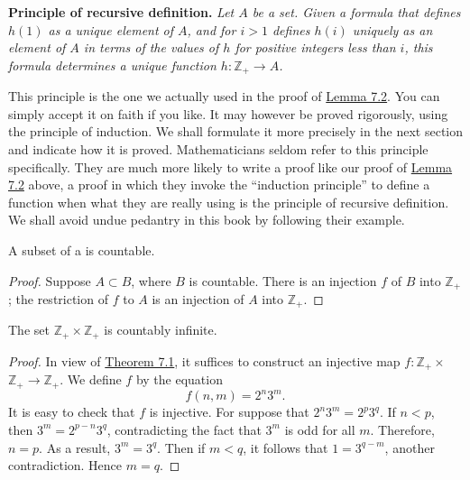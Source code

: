 \noindent\textbf{Principle of recursive definition.} \textsl{Let \(A\) be a set. Given a formula that defines \(h(1)\) as a unique element of \(A\), and for \(i > 1\) defines \(h(i)\) uniquely as an element of \(A\) in terms of the values of \(h\) for positive integers less than \(i\), this formula determines a unique function \(h : \mathbb{Z}_{+} \rightarrow A\).}

This principle is the one we actually used in the proof of \hyperref[lem:7.2]{Lemma 7.2}. You can simply accept it on faith if you like. It may however be proved rigorously, using the principle of induction. We shall formulate it more precisely in the next section and indicate how it is proved. Mathematicians seldom refer to this principle specifically. They are much more likely to write a proof like our proof of \hyperref[lem:7.2]{Lemma 7.2} above, a proof in which they invoke the ``induction principle'' to define a function when what they are really using is the principle of recursive definition. We shall avoid undue pedantry in this book by following their example.

\begin{corollary}
\label{cor:\thetheorem}
 A subset of a  is countable.
\end{corollary}

\begin{proof}
 Suppose \(A \subset B\), where \(B\) is countable. There is an injection \(f\) of \(B\) into \(\mathbb{Z}_{+}\) ; the restriction of \(f\) to \(A\) is an injection of \(A\) into \(\mathbb{Z}_{+}\).
\end{proof}

\begin{corollary}
\label{cor:\thetheorem}
 The set \(\mathbb{Z}_{+} \times {\mathbb{Z}}_{+}\) is countably infinite.
\end{corollary}

\begin{proof}
 In view of \hyperref[thm:7.1]{Theorem 7.1}, it suffices to construct an injective map \(f : \mathbb{Z}_{+} \times\) \(\mathbb{Z}_{+} \rightarrow {\mathbb{Z}}_{+}\). We define \(f\) by the equation
 \[
 f({n,m}) = 2^{n}3^{m}.
 \]
 It is easy to check that \(f\) is injective. For suppose that \(2^{n}3^{m} = 2^{p}3^{q}\). If \(n < p\), then \(3^{m} = 2^{p - n}3^{q}\), contradicting the fact that \(3^{m}\) is odd for all \(m\). Therefore, \(n = p\). As a result, \(3^{m} = 3^{q}\). Then if \(m < q\), it follows that \(1 = 3^{q - m}\), another contradiction. Hence \(m = q\).
\end{proof}

